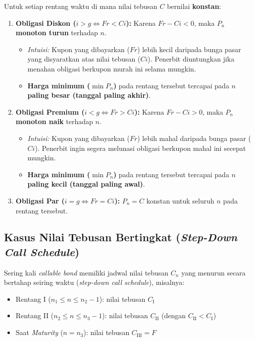 \documentclass[11pt,a4paper]{article}
\begin{document}
\begin{theorembox}
Untuk setiap rentang waktu di mana nilai tebusan $C$ bernilai \textbf{konstan}:
\begin{enumerate}[label=\textbf{\arabic*.}]
    \item \textbf{Obligasi Diskon ($i > g \iff Fr < Ci$):}
    Karena $Fr - Ci < 0$, maka $P_n$ \textbf{monoton turun} terhadap $n$.
    \begin{itemize}
        \item \textit{Intuisi:} Kupon yang dibayarkan ($Fr$) lebih kecil daripada bunga pasar yang disyaratkan atas nilai tebusan ($Ci$). Penerbit diuntungkan jika menahan obligasi berkupon murah ini selama mungkin.
        \item \textbf{Harga minimum ($\min P_n$)} pada rentang tersebut tercapai pada \textbf{$n$ paling besar (tanggal paling akhir)}.
    \end{itemize}
    \item \textbf{Obligasi Premium ($i < g \iff Fr > Ci$):}
    Karena $Fr - Ci > 0$, maka $P_n$ \textbf{monoton naik} terhadap $n$.
    \begin{itemize}
        \item \textit{Intuisi:} Kupon yang dibayarkan ($Fr$) lebih mahal daripada bunga pasar ($Ci$). Penerbit ingin segera melunasi obligasi berkupon mahal ini secepat mungkin.
        \item \textbf{Harga minimum ($\min P_n$)} pada rentang tersebut tercapai pada \textbf{$n$ paling kecil (tanggal paling awal)}.
    \end{itemize}
    \item \textbf{Obligasi Par ($i = g \iff Fr = Ci$):}
    $P_n = C$ konstan untuk seluruh $n$ pada rentang tersebut.
\end{enumerate}
\end{theorembox}

\subsection{Kasus Nilai Tebusan Bertingkat (\textit{Step-Down Call Schedule})}

Sering kali \textit{callable bond} memiliki jadwal nilai tebusan $C_n$ yang menurun secara bertahap seiring waktu (\textit{step-down call schedule}), misalnya:
\begin{itemize}
    \item Rentang I ($n_1 \le n \le n_2 - 1$): nilai tebusan $C_{\text{I}}$
    \item Rentang II ($n_2 \le n \le n_3 - 1$): nilai tebusan $C_{\text{II}}$ (dengan $C_{\text{II}} < C_{\text{I}}$)
    \item Saat \textit{Maturity} ($n = n_3$): nilai tebusan $C_{\text{III}} = F$
\end{itemize}
\end{document}
